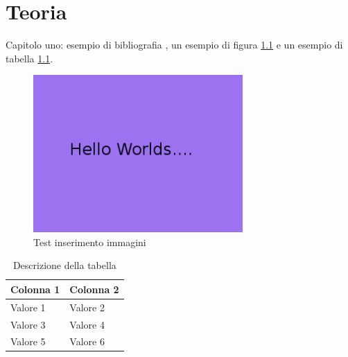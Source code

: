 \chapter{Teoria}
\label{teoria}


Capitolo uno:
esempio di bibliografia \cite{2015arXiv150200046K}, un esempio di figura \ref{figure:test inserimento} e un esempio di tabella \ref{table:esempio_tabella}.

\begin{figure}
	\centering
	\includegraphics[width=8cm]{images/example.png}
	\caption{Test inserimento immagini}
	\label{figure:test inserimento}
\end{figure}

\begin{table}[!htbp]
	\centering
	\begin{tabular}{l|l}
		\toprule
		Colonna 1 & Colonna 2 \\
		\midrule
		Valore 1 & Valore 2 \\
		Valore 3 & Valore 4 \\
		Valore 5 & Valore 6 \\
		\bottomrule
	\end{tabular}
	\caption{Descrizione della tabella}
	\label{table:esempio_tabella}
\end{table}